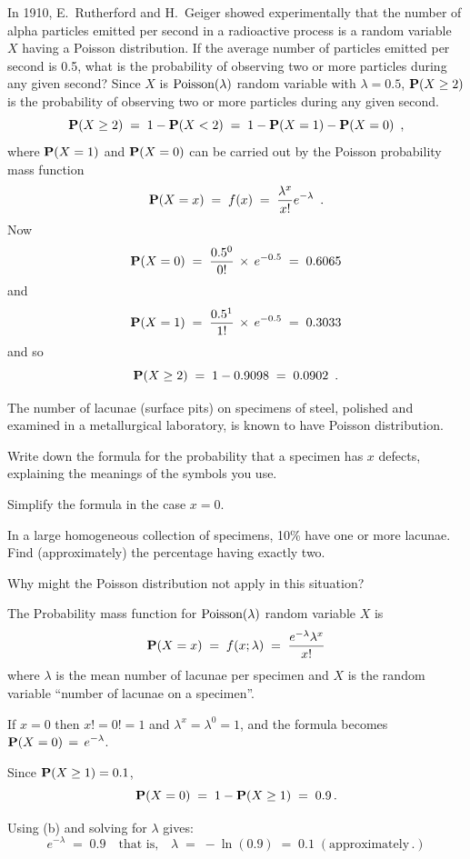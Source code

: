 \begin{ExerciseList}
\Exercise
In 1910, E.~Rutherford and H.~Geiger showed experimentally that the number of alpha particles emitted per second in a radioactive process is a random variable $X$ having a Poisson distribution. If the average number of particles emitted per second is  0.5, what is the probability of observing two or more particles during any given second?
\Answer
Since $X$ is $\mbox{{\rm Poisson}}(\lambda)$ random variable with $\lambda=0.5$, $\mathbf{P}(X\geq2)$ 
is the probability of observing two or more particles during any
given second. $$\mathbf{P}(X\geq 2)\;=\;1-\mathbf{P}(X<2)\;=\;1-\mathbf{P}(X=1)-\mathbf{P}(X=0)\enspace,$$
where $\mathbf{P}(X=1)$ and $\mathbf{P}(X=0)$ can be carried out by the Poisson
probability mass function $$\mathbf{P}(X=x)\;=\; f(x)\;=\;\frac{\lambda^x}{x!}e^{-\lambda}\enspace.$$
Now \[\mathbf{P}(X=0)\;=\;\frac{0.5^0}{0!}\,\times \,e^{-0.5} \;=\; 0.6065\] and
\[ \mathbf{P}(X=1)\;=\;\frac{0.5^1}{1!}\,\times \, e^{-0.5}\;=\; 0.3033\] and so
$$\mathbf{P}(X\geq 2)\;=\; 1- 0.9098\;= \;0.0902\enspace.$$

\Exercise 
The number of lacunae (surface pits) on specimens of steel, polished and examined in a metallurgical laboratory, is known to have Poisson distribution.
\be
\item Write down the formula for the probability that a specimen has $x$
  defects, explaining the meanings of the symbols you use.
\item Simplify the formula in the case $x=0$.
\item In a large homogeneous collection of specimens, 10\% have one or more lacunae. Find (approximately) the percentage having exactly two.
\item Why might the Poisson distribution not apply in this situation?
\ee
\Answer
\be
\item The Probability mass function for $\mbox{{\rm Poisson}}(\lambda)$ random variable $X$ is 
\[\mathbf{P}(X=x)\;=\;f(x;\lambda)\;=\; \frac{e^{-\lambda}\lambda^x}{x!}\]
where $\lambda$ is the mean number of lacunae per specimen and $X$ is
the random variable ``number of lacunae on a specimen''.

\item If $x=0$ then $x!=0!=1$ and $\lambda^x=\lambda^0=1$, and the formula becomes  
$\displaystyle \mathbf{P}(X=0) \,=\, e^{-\lambda}$.

\item Since $\mathbf{P}(X \geq 1) = 0.1$, \[\mathbf{P}( X=0)\;=\; 1 -  \mathbf{P}(X \geq 1)\;=\; 0.9\,.\]

Using (b) and solving for $\lambda$ gives:
\[ e^{-\lambda}\;=\; 0.9 \quad \text{that is,}\quad \lambda \;=\; -\ln(0.9) \;=\; 0.1\;
(\text{approximately}\,.)\]


\end{ExerciseList}
